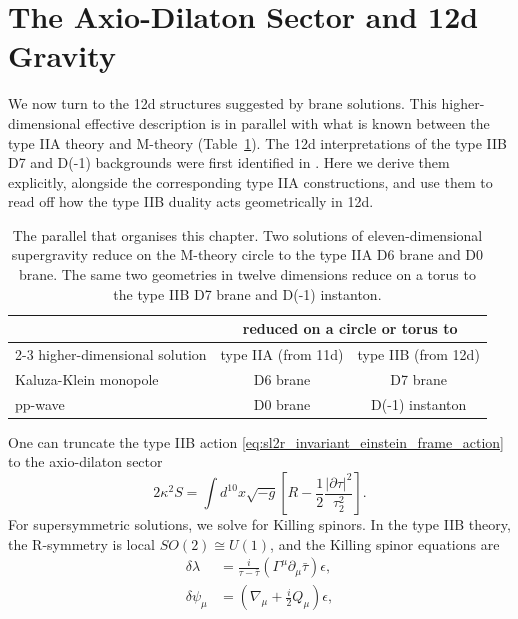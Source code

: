 \section{The Axio-Dilaton Sector and 12d Gravity}
\label{sec:axio-dilaton-12d}
We now turn to the 12d structures suggested by brane solutions.
This higher-dimensional effective description is in parallel with what is known between the type IIA theory and M-theory (Table~\ref{tab:iia-iib-uplift}).
The 12d interpretations of the type IIB D7 and D(-1) backgrounds were first identified in \cite{Vafa:1996xn,Tseytlin:1996ne}. Here we derive them explicitly, alongside the corresponding type IIA constructions, and use them to read off how the type IIB \SLZ{} duality acts geometrically in 12d.

\begin{table}[ht]
\centering
\begin{tabular}{lcc}
\toprule
 & \multicolumn{2}{c}{reduced on a circle or torus to}\\
\cmidrule(l){2-3}
higher-dimensional solution & type IIA (from 11d) & type IIB (from 12d)\\
\midrule
Kaluza-Klein monopole & D6 brane & D7 brane\\
pp-wave               & D0 brane & D(-1) instanton\\
\bottomrule
\end{tabular}
\caption{The parallel that organises this chapter. 
Two solutions of eleven-dimensional supergravity reduce on the M-theory circle to the type IIA D6 brane and D0 brane. 
The same two geometries in twelve dimensions reduce on a torus to the type IIB D7 brane and D(-1) instanton.}
\label{tab:iia-iib-uplift}
\end{table}
One can truncate the type IIB action \eqref{eq:sl2r_invariant_einstein_frame_action} to the axio-dilaton sector
\begin{equation}
2\kappa^2S=
\int d^{10}x\sqrt{-g}\left[
R-\frac{1}{2}\frac{|\partial \tau|^2}{\tau_2^2}
\right].
\label{IIB axio-dilaton action}
\end{equation}
For supersymmetric solutions, we solve for Killing spinors.
In the type IIB theory, the R-symmetry is local $SO(2)\cong U(1)$, and the Killing spinor equations are \cite{Bergshoeff:2006jj}
\begin{equation}
\begin{aligned}
\delta\lambda
&=\frac{i}{\tau-\bar\tau}(\Gamma^\mu\partial_\mu \bar\tau)\epsilon,\\
\delta\psi_\mu
&=
\left(\nabla_\mu+\frac{i}{2}Q_\mu\right)\epsilon,
\end{aligned}
\label{9+1 IIB axio-dilaton Killing spinor equations}
\end{equation}
